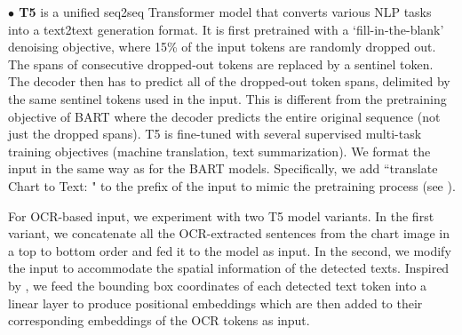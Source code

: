  

\vspace{0.5em}
\noindent  \textbf{$\bullet$ T5}
\cite{Raffel2020t5} is a unified seq2seq Transformer 
model 
that converts various NLP tasks into a text2text generation format. It is first pretrained with a `fill-in-the-blank' denoising objective, where 15\% of the input tokens are randomly dropped out. The spans of consecutive dropped-out tokens are replaced by a sentinel token. The decoder then has to predict all of the dropped-out token spans, delimited by the same sentinel tokens used in the input. This is different from the pretraining objective of BART where the decoder predicts the entire original sequence (not just the dropped spans). T5 is  fine-tuned with several supervised multi-task training objectives (\eg machine translation, text summarization). We format the input in the same way as for the BART models. Specifically, we add ``translate Chart to Text: " to the prefix of the input to mimic the pretraining process (see ). 


 

{For OCR-based input, we experiment with two T5 model variants. In the first variant, we concatenate all the OCR-extracted sentences from the chart image in a top to bottom order and fed it to the model as input. In the second, we modify the input to accommodate the spatial information of the detected texts. Inspired by \citet{lxmert}, we feed the bounding box coordinates of each detected text token into a linear layer to produce  positional embeddings which are then added to their corresponding embeddings of the OCR tokens as input.} 




 
   